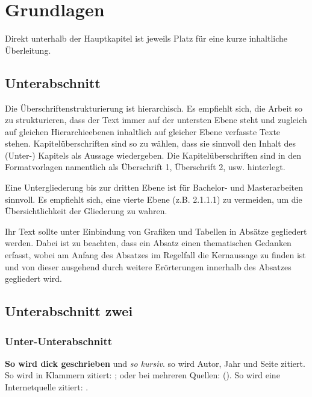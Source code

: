 \section{Grundlagen} \label{grundlagen}

Direkt unterhalb der Hauptkapitel ist jeweils Platz für eine kurze inhaltliche Überleitung.



\subsection{Unterabschnitt}

Die Überschriftenstrukturierung ist hierarchisch. Es empfiehlt sich, die Arbeit so zu strukturieren, dass der Text immer auf der untersten Ebene steht und zugleich auf gleichen Hierarchieebenen inhaltlich auf gleicher Ebene verfasste Texte stehen.
Kapitelüberschriften sind so zu wählen, dass sie sinnvoll den Inhalt des (Unter-) Kapitels als Aussage wiedergeben.
Die Kapitelüberschriften sind in den Formatvorlagen namentlich als Überschrift 1, Überschrift 2, usw. hinterlegt.

Eine Untergliederung bis zur dritten Ebene ist für Bachelor- und Masterarbeiten sinnvoll.
Es empfiehlt sich, eine vierte Ebene (z.B. 2.1.1.1) zu vermeiden, um die Übersichtlichkeit der Gliederung zu wahren.

Ihr Text sollte unter Einbindung von Grafiken und Tabellen in Absätze gegliedert werden.
Dabei ist zu beachten, dass ein Absatz einen thematischen Gedanken erfasst, wobei am Anfang des Absatzes im Regelfall die Kernaussage zu finden ist und von dieser ausgehend durch weitere Erörterungen innerhalb des Absatzes gegliedert wird.




\subsection{Unterabschnitt zwei}

\subsubsection{Unter-Unterabschnitt}

\textbf{So wird dick geschrieben} und \textit{so kursiv}. 
\citet[685]{janiesch2021machine} so wird Autor, Jahr und Seite zitiert.
So wird in Klammern zitiert: \citep[685]{janiesch2021machine}; oder bei mehreren Quellen: (\cites[685]{janiesch2021machine}[289]{herm2021symbolic}).
So wird eine Internetquelle zitiert: \citet{diewi}.

